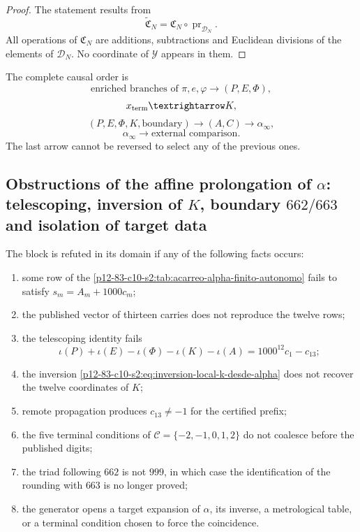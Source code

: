 \begin{proof}
The statement results from
\[
 \widetilde{\mathfrak C}_N
 =\mathfrak C_N\circ\operatorname{pr}_{\mathscr D_N}.
\]
All operations of \(\mathfrak C_N\) are additions, subtractions and Euclidean
divisions of the elements of \(\mathscr D_N\). No coordinate of
\(\mathscr Y\) appears in them.
\end{proof}

The complete causal order is
\[
 \text{enriched branches of }\pi,e,\varphi
 \longrightarrow(P,E,\Phi),
\]
\[
 x_{\rm term}\longrightarrow K,
\]
\[
 (P,E,\Phi,K,\text{boundary})
 \longrightarrow(A,C)
 \longrightarrow\alpha_\infty,
\]
\[
 \alpha_\infty
 \longrightarrow\text{external comparison}.
\]
The last arrow cannot be reversed to select any of the previous ones.

\subsection{Obstructions of the affine prolongation of \(\alpha\): telescoping, inversion of \(K\), boundary \(662/663\) and isolation of target data}

\begin{criterion}
The block is refuted in its domain if any of the following facts
occurs:
\begin{enumerate}
 \item some row of the \cref{p12-83-c10-s2:tab:acarreo-alpha-finito-autonomo}
       fails to satisfy \(s_m=A_m+1000c_m\);
 \item the published vector of thirteen carries does not reproduce the twelve rows;
 \item the telescoping identity fails
       \[
       \iota(P)+\iota(E)-\iota(\Phi)-\iota(K)-\iota(A)
       =1000^{12}c_1-c_{13};
       \]
 \item the inversion \eqref{p12-83-c10-s2:eq:inversion-local-k-desde-alpha} does not recover
       the twelve coordinates of \(K\);
 \item remote propagation produces \(c_{13}\neq-1\) for the certified
       prefix;
 \item the five terminal conditions of
       \(\mathcal C=\{-2,-1,0,1,2\}\) do not coalesce before the published
       digits;
 \item the triad following \(662\) is not \(999\), in which case the
       identification of the rounding with \(663\) is no longer proved;
 \item the generator opens a target expansion of \(\alpha\), its inverse,
       a metrological table, or a terminal condition chosen to force
       the coincidence.
\end{enumerate}
\end{criterion}

